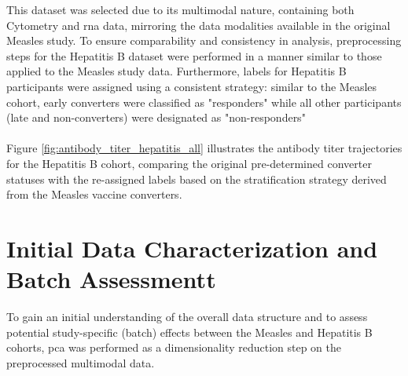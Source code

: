 \documentclass[12pt,a4paper]{report}
\begin{document}
\noindent
This dataset was selected due to its multimodal nature, containing both Cytometry and \acrshort{rna} data, mirroring the data modalities available in the original Measles study. To ensure comparability and consistency in analysis, preprocessing steps for the Hepatitis B dataset were performed in a manner similar to those applied to the Measles study data. Furthermore, labels for Hepatitis B participants were assigned using a consistent strategy: similar to the Measles cohort, early converters were classified as "responders" while all other participants (late and non-converters) were designated as "non-responders"\\
\\
Figure \ref{fig:antibody_titer_hepatitis_all} illustrates the antibody titer trajectories for the Hepatitis B cohort, comparing the original pre-determined converter statuses with the re-assigned labels based on the stratification strategy derived from the Measles vaccine converters.

\section{Initial Data Characterization and Batch Assessmentt}
\noindent
To gain an initial understanding of the overall data structure and to assess potential study-specific (batch) effects between the Measles and Hepatitis B cohorts, \acrfull{pca} was performed as a dimensionality reduction step on the preprocessed multimodal data.\\
\end{document}
